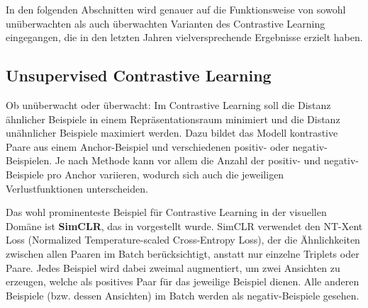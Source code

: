 In den folgenden Abschnitten wird genauer auf die Funktionsweise von sowohl unüberwachten als auch überwachten Varianten des Contrastive Learning eingegangen, die in den letzten Jahren vielversprechende Ergebnisse erzielt haben.

\subsection{Unsupervised Contrastive Learning} \label{sec:unsup-contrastive}

Ob unüberwacht oder überwacht: Im Contrastive Learning soll die Distanz ähnlicher Beispiele in einem Repräsentationsraum minimiert und die Distanz unähnlicher Beispiele maximiert werden. Dazu bildet das Modell kontrastive Paare aus einem Anchor-Beispiel und verschiedenen positiv- oder negativ-Beispielen. Je nach Methode kann vor allem die Anzahl der positiv- und negativ-Beispiele pro Anchor variieren, wodurch sich auch die jeweiligen Verlustfunktionen unterscheiden.

Das wohl prominenteste Beispiel für Contrastive Learning in der visuellen Domäne ist \textbf{SimCLR}, das in \parencite{Chen2020simclr} vorgestellt wurde. SimCLR verwendet den NT-Xent Loss (Normalized Temperature-scaled Cross-Entropy Loss), der die Ähnlichkeiten zwischen allen Paaren im Batch berücksichtigt, anstatt nur einzelne Triplets oder Paare. Jedes Beispiel wird dabei zweimal augmentiert, um zwei Ansichten zu erzeugen, welche als positives Paar für das jeweilige Beispiel dienen. Alle anderen Beispiele (bzw. dessen Ansichten) im Batch werden als negativ-Beispiele gesehen.

